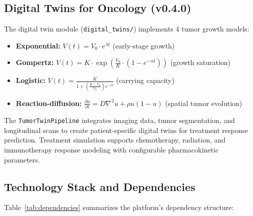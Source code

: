 \subsection{Digital Twins for Oncology (v0.4.0)}
\label{sec:digital-twins}

The digital twin module (\texttt{digital\_twins/}) implements 4 tumor growth models:
\begin{itemize}
  \item \textbf{Exponential:} $V(t) = V_0 \cdot e^{\lambda t}$ (early-stage growth)
  \item \textbf{Gompertz:} $V(t) = K \cdot \exp\left(\frac{V_0}{K} \cdot (1 - e^{-\alpha t})\right)$ (growth saturation)
  \item \textbf{Logistic:} $V(t) = \frac{K}{1 + \left(\frac{K - V_0}{V_0}\right) e^{-r t}}$ (carrying capacity)
  \item \textbf{Reaction-diffusion:} $\frac{\partial u}{\partial t} = D\nabla^2 u + \rho u(1-u)$ (spatial tumor evolution)
\end{itemize}

The \texttt{TumorTwinPipeline} integrates imaging data, tumor segmentation, and longitudinal scans to create patient-specific digital twins for treatment response prediction. Treatment simulation supports chemotherapy, radiation, and immunotherapy response modeling with configurable pharmacokinetic parameters.

\subsection{Technology Stack and Dependencies}
\label{sec:tech-stack}

Table~\ref{tab:dependencies} summarizes the platform's dependency structure:

